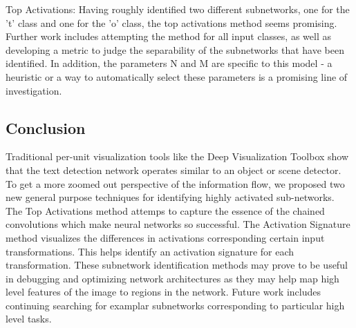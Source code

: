 \documentclass[10pt,twocolumn,letterpaper]{article}
\begin{document}
Top Activations:
Having roughly identified two different subnetworks, one for the 't' class and one for the 'o' class, the top activations method seems promising. Further work includes attempting the method for all input classes, as well as developing a metric to judge the separability of the subnetworks that have been identified. In addition, the parameters N and M are specific to this model - a heuristic or a way to automatically select these parameters is a promising line of investigation.



\subsection{Conclusion}
Traditional per-unit visualization tools like the Deep Visualization Toolbox \cite{yosinski2015understanding} show that the text detection network operates similar to an object or scene detector. To get a more zoomed out perspective of the information flow, we proposed two new general purpose techniques for identifying highly activated sub-networks. The Top Activations method attemps to capture the essence of the chained convolutions which make neural networks so successful. The Activation Signature method visualizes the differences in activations corresponding certain input transformations. This helps identify an activation signature for each transformation. These subnetwork identification methods may prove to be useful in debugging and optimizing network architectures as they may help map high level features of the image to regions in the network. Future work includes continuing searching for examplar subnetworks corresponding to particular high level tasks.




{\small


}
\end{document}
